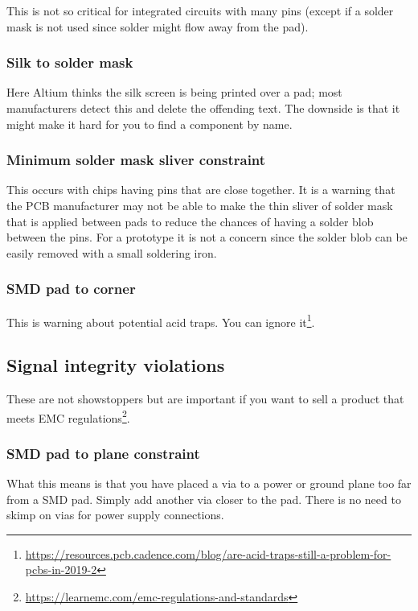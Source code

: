This is not so critical for integrated circuits with many pins (except
if a solder mask is not used since solder might flow away from the
pad).


\subsubsection{Silk to solder mask}

Here Altium thinks the silk screen is being printed over a pad; most
manufacturers detect this and delete the offending text.  The downside
is that it might make it hard for you to find a component by name.


\subsubsection{Minimum solder mask sliver constraint}

This occurs with chips having pins that are close together.  It is a
warning that the PCB manufacturer may not be able to make the thin
sliver of solder mask that is applied between pads to reduce the
chances of having a solder blob between the pins.  For a prototype it
is not a concern since the solder blob can be easily removed with a
small soldering iron.


\subsubsection{SMD pad to corner}

This is warning about potential acid traps.  You can ignore
it\footnote{\url{https://resources.pcb.cadence.com/blog/are-acid-traps-still-a-problem-for-pcbs-in-2019-2}}.


\subsection{Signal integrity violations}

These are not showstoppers but are important if you want to sell a
product that meets EMC
regulations\footnote{\url{https://learnemc.com/emc-regulations-and-standards}}.


\subsubsection{SMD pad to plane constraint}

What this means is that you have placed a via to a power or ground
plane too far from a SMD pad.  Simply add another via closer to the
pad.  There is no need to skimp on vias for power supply connections.

